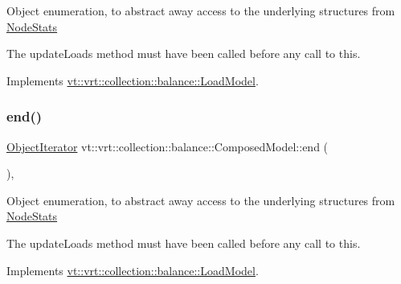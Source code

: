 Object enumeration, to abstract away access to the underlying structures from \hyperlink{structvt_1_1vrt_1_1collection_1_1balance_1_1_node_stats}{Node\+Stats}

The {\ttfamily update\+Loads} method must have been called before any call to this. 

Implements \hyperlink{classvt_1_1vrt_1_1collection_1_1balance_1_1_load_model_a6ca139b4f14d79d1d59b46016efae221}{vt\+::vrt\+::collection\+::balance\+::\+Load\+Model}.

\mbox{\label{classvt_1_1vrt_1_1collection_1_1balance_1_1_composed_model_a23ca95221c6bffb7417aafa2c939b40a}} 
\subsubsection{\texorpdfstring{end()}{end()}}
{\footnotesize\ttfamily \hyperlink{classvt_1_1vrt_1_1collection_1_1balance_1_1_object_iterator}{Object\+Iterator} vt\+::vrt\+::collection\+::balance\+::\+Composed\+Model\+::end (\begin{DoxyParamCaption}{ }\end{DoxyParamCaption})\hspace{0.3cm}{\ttfamily [override]}, {\ttfamily [virtual]}}

Object enumeration, to abstract away access to the underlying structures from \hyperlink{structvt_1_1vrt_1_1collection_1_1balance_1_1_node_stats}{Node\+Stats}

The {\ttfamily update\+Loads} method must have been called before any call to this. 

Implements \hyperlink{classvt_1_1vrt_1_1collection_1_1balance_1_1_load_model_a8474fb097bddbd75711e1e8d74084651}{vt\+::vrt\+::collection\+::balance\+::\+Load\+Model}.

\mbox{\label{classvt_1_1vrt_1_1collection_1_1balance_1_1_composed_model_a20736b80cf2b19d1a9352363b48039e0}} 
